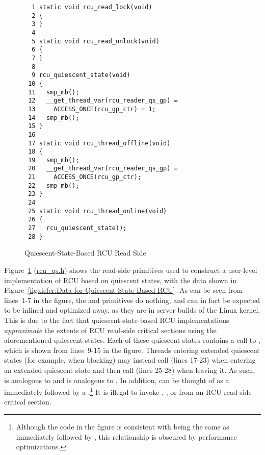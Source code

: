 \begin{figure}[tbp]
{ \scriptsize
\begin{verbatim}
  1 static void rcu_read_lock(void)
  2 {
  3 }
  4
  5 static void rcu_read_unlock(void)
  6 {
  7 }
  8
  9 rcu_quiescent_state(void)
 10 {
 11   smp_mb();
 12   __get_thread_var(rcu_reader_qs_gp) =
 13     ACCESS_ONCE(rcu_gp_ctr) + 1;
 14   smp_mb();
 15 }
 16
 17 static void rcu_thread_offline(void)
 18 {
 19   smp_mb();
 20   __get_thread_var(rcu_reader_qs_gp) =
 21     ACCESS_ONCE(rcu_gp_ctr);
 22   smp_mb();
 23 }
 24
 25 static void rcu_thread_online(void)
 26 {
 27   rcu_quiescent_state();
 28 }
\end{verbatim}
}
\caption{Quiescent-State-Based RCU Read Side}
\label{fig:defer:Quiescent-State-Based RCU Read Side}
\end{figure}

Figure~\ref{fig:defer:Quiescent-State-Based RCU Read Side}
(\url{rcu_qs.h})
shows the read-side primitives used to construct a user-level
implementation of RCU based on quiescent states, with the data shown in
Figure~\ref{fig:defer:Data for Quiescent-State-Based RCU}.
As can be seen from lines~1-7 in the figure, the 
and  primitives do nothing, and can in fact
be expected to be inlined and optimized away, as they are in
server builds of the Linux kernel.
This is due to the fact that quiescent-state-based RCU implementations
\emph{approximate} the extents of RCU read-side critical sections
using the aforementioned quiescent states.
Each of these quiescent states contains a call to
, which is shown from lines~9-15 in the figure.
Threads entering extended quiescent states (for example, when blocking)
may instead call  (lines 17-23) when entering
an extended quiescent state and then call
 (lines 25-28) when leaving it.
As such,  is analogous to 
and  is analogous to .
In addition,  can be thought of as a
 immediately followed by a
.\footnote{
	Although the code in the figure is consistent with
	being the same as  immediately followed by
	, this relationship is obscured by
	performance optimizations.}
It is illegal to invoke , ,
or  from an RCU read-side critical section.

